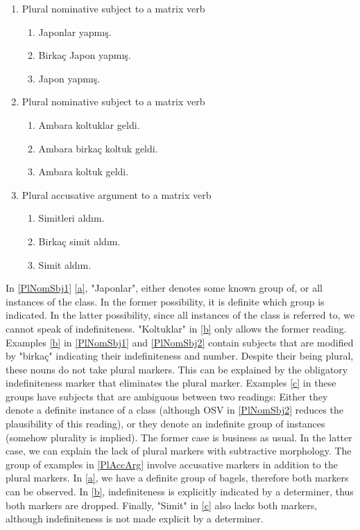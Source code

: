 \documentclass[11pt]{article} %
\begin{document}
\begin{enumerate}[resume*] 
	\item Plural nominative subject to a matrix verb \label{PlNomSbj1}
	\begin{enumerate}[label=(\alph*), ref=(\alph*)]\itemsep1pt
	\item Japonlar yapmış. \label{a}
	\item Birkaç Japon yapmış. \label{b}
	\item Japon yapmış. \label{c}
	\end{enumerate}
	
	\item Plural nominative subject to a matrix verb \label{PlNomSbj2}
	\begin{enumerate}[label=(\alph*), ref=(\alph*)]\itemsep1pt
	\item Ambara koltuklar geldi. \label{a}
	\item Ambara birkaç koltuk geldi. \label{b}
	\item Ambara koltuk geldi. \label{c}
	\end{enumerate}
	
	\item Plural accusative argument to a matrix verb \label{PlAccArg}
	\begin{enumerate}[label=(\alph*), ref=(\alph*)]\itemsep1pt
	\item Simitleri aldım. \label{a}
	\item Birkaç simit aldım. \label{b}
	\item Simit aldım. \label{c}
	\end{enumerate}
\end{enumerate}

In \ref{PlNomSbj1} \ref{a}, "Japonlar", either denotes some known group of, or all instances of the class. In the former possibility, it is definite which group is indicated. In the latter possibility, since all instances of the class is referred to, we cannot speak of indefiniteness. "Koltuklar" in \ref{b} only allows the former reading. Examples \ref{b} in \ref{PlNomSbj1} and \ref{PlNomSbj2} contain subjects that are modified by "birkaç" indicating their indefiniteness and number. Despite their being plural, these nouns do not take plural markers. This can be explained by the obligatory indefiniteness marker that eliminates the plural marker. Examples \ref{c} in these groups have subjects that are ambiguous between two readings: Either they denote a definite instance of a class (although OSV in \ref{PlNomSbj2} reduces the plausibility of this reading), or they denote an indefinite group of instances (somehow plurality is implied). The former case is business as usual. In the latter case, we can explain the lack of plural markers with subtractive morphology. The group of examples in \ref{PlAccArg} involve accusative markers in addition to the plural markers. In \ref{a}, we have a definite group of bagels, therefore both markers can be observed. In \ref{b}, indefiniteness is explicitly indicated by a determiner, thus both markers are dropped. Finally, "Simit" in \ref{c} also lacks both markers, although indefiniteness is not made explicit by a determiner. \\
\end{document}
